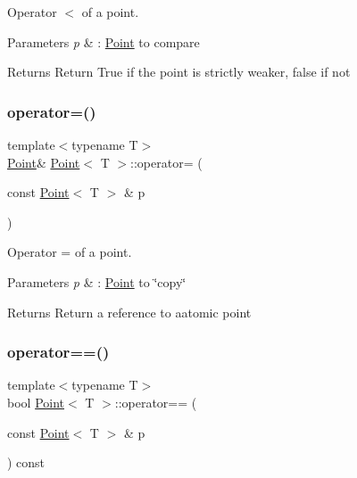 Operator $<$ of a point. 


\begin{DoxyParams}{Parameters}
{\em p} & \+: \hyperlink{classPoint}{Point} to compare \\
\hline
\end{DoxyParams}
\begin{DoxyReturn}{Returns}
Return True if the point is strictly weaker, false if not 
\end{DoxyReturn}
\mbox{\label{classPoint_a2e9aa15e5410f48937c9d474262dab3e}} 
\subsubsection{\texorpdfstring{operator=()}{operator=()}}
{\footnotesize\ttfamily template$<$typename T$>$ \\
\hyperlink{classPoint}{Point}\& \hyperlink{classPoint}{Point}$<$ T $>$\+::operator= (\begin{DoxyParamCaption}\item[{const \hyperlink{classPoint}{Point}$<$ T $>$ \&}]{p }\end{DoxyParamCaption})\hspace{0.3cm}{\ttfamily [inline]}}



Operator = of a point. 


\begin{DoxyParams}{Parameters}
{\em p} & \+: \hyperlink{classPoint}{Point} to \char`\"{}copy\char`\"{} \\
\hline
\end{DoxyParams}
\begin{DoxyReturn}{Returns}
Return a reference to aatomic point 
\end{DoxyReturn}
\mbox{\label{classPoint_aaaaac8f25a60bca6ae5ddbb34fd3e9d8}} 
\subsubsection{\texorpdfstring{operator==()}{operator==()}}
{\footnotesize\ttfamily template$<$typename T$>$ \\
bool \hyperlink{classPoint}{Point}$<$ T $>$\+::operator== (\begin{DoxyParamCaption}\item[{const \hyperlink{classPoint}{Point}$<$ T $>$ \&}]{p }\end{DoxyParamCaption}) const\hspace{0.3cm}{\ttfamily [inline]}}



